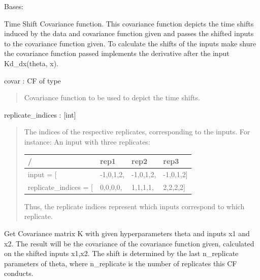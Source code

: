 \documentclass[letterpaper,10pt,english]{sphinxmanual}
\begin{document}

\begin{fulllineitems}
\label{covars:pygp.covar.combinators.ShiftCF}
Bases: 

Time Shift Covariance function. This covariance function depicts
the time shifts induced by the data and covariance function given
and passes the shifted inputs to the covariance function given.
To calculate the shifts of the inputs make shure the covariance
function passed implements the derivative after the input
Kd\_dx(theta, x).

covar : CF of type {\hyperref[covars:pygp.covar.CovarianceFunction]{}}
\begin{quote}

Covariance function to be used to depict the time shifts.
\end{quote}

replicate\_indices : {[}int{]}
\begin{quote}

The indices of the respective replicates, corresponding to
the inputs. For instance: An input with three replicates:

\begin{tabulary}{\linewidth}{|L|L|L|L|}
\hline
\textbf{
/
} & \textbf{
rep1
} & \textbf{
rep2
} & \textbf{
rep3
}\\\hline

input = {[}
 & 
-1,0,1,2,
 & 
-1,0,1,2,
 & 
-1,0,1,2{]}
\\\hline

replicate\_indices = {[}
 & 
0,0,0,0,
 & 
1,1,1,1,
 & 
2,2,2,2{]}
\\\hline
\end{tabulary}


Thus, the replicate indices represent
which inputs correspond to which replicate.
\end{quote}

\begin{fulllineitems}
\label{covars:pygp.covar.combinators.ShiftCF.K}
Get Covariance matrix K with given hyperparameters
theta and inputs x1 and x2. The result
will be the covariance of the covariance
function given, calculated on the shifted inputs x1,x2.
The shift is determined by the last n\_replicate parameters of
theta, where n\_replicate is the number of replicates this
CF conducts.


\end{fulllineitems}
\end{fulllineitems}
\end{document}
